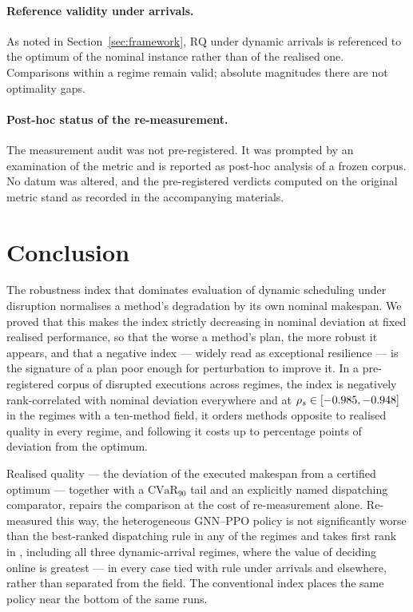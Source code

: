\documentclass[a4paper,fleqn]{cas-sc}
\newcommand{\RQ}{\mathrm{RQ}}
\newcommand{\CVaR}{\mathrm{CVaR}}
\begin{document}
\paragraph{Reference validity under arrivals.} As noted in
Section~\ref{sec:framework}, $\RQ$ under dynamic arrivals is referenced to the
optimum of the nominal instance rather than of the realised one. Comparisons
within a regime remain valid; absolute magnitudes there are not optimality gaps.

\paragraph{Post-hoc status of the re-measurement.} The measurement audit was not
pre-registered. It was prompted by an examination of the metric and is reported
as post-hoc analysis of a frozen corpus. No datum was altered, and the
pre-registered verdicts computed on the original metric stand as recorded in the
accompanying materials.

\section{Conclusion}\label{sec:conclusion}

The robustness index that dominates evaluation of dynamic scheduling under
disruption normalises a method's degradation by its own nominal makespan. We
proved that this makes the index strictly decreasing in nominal deviation at
fixed realised performance, so that the worse a method's plan, the more robust
it appears, and that a negative index --- widely read as exceptional resilience
--- is the signature of a plan poor enough for perturbation to improve it. In a
pre-registered corpus of \NRunsDisrupted{} disrupted executions across
\NRegimes{} regimes, the index is negatively rank-correlated with nominal
deviation everywhere and at $\rho_s\in[-0.985{},-0.948{}]$ in the
\NConfRegimes{} regimes with a ten-method field, it orders methods opposite to
realised quality in every regime, and following it costs up to \PenaltyMax{}
percentage points of deviation from the optimum.

Realised quality --- the deviation of the executed makespan from a certified
optimum --- together with a $\CVaR_{90}$ tail and an explicitly named
dispatching comparator, repairs the comparison at the cost of re-measurement
alone. Re-measured this way, the heterogeneous GNN--PPO policy is not
significantly worse than the best-ranked dispatching rule in any of the
\NRegimes{} regimes and takes first rank in \NRLBest{}, including all three
dynamic-arrival regimes, where the value of deciding online is greatest --- in
every case tied with \CliqueArr{} rule under arrivals and \CliqueOther{}
elsewhere, rather than separated from the field. The
conventional index places the same policy near the bottom of the same runs.
\end{document}
